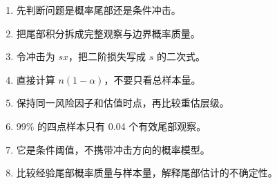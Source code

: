 \begin{enumerate}[leftmargin=*]
  \item 先判断问题是概率尾部还是条件冲击。
  \item 把尾部积分拆成完整观察与边界概率质量。
  \item 令冲击为 $sx$，把二阶损失写成 $s$ 的二次式。
  \item 直接计算 $n(1-\alpha)$，不要只看总样本量。
  \item 保持同一风险因子和估值时点，再比较重估层级。
  \item 99\% 的四点样本只有 0.04 个有效尾部观察。
  \item 它是条件阈值，不携带冲击方向的概率模型。
  \item 比较经验尾部概率质量与样本量，解释尾部估计的不确定性。
\end{enumerate}


\MFQMappedPortfolioTailHints
